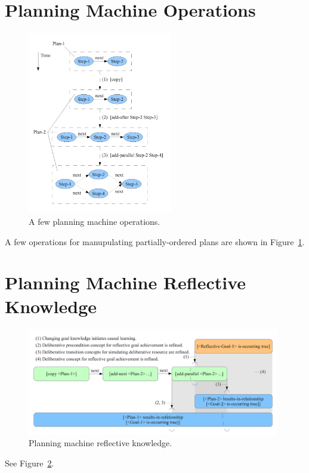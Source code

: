 \section{Planning Machine Operations}

\begin{figure}[bth]
  \center
  \includegraphics[height=8cm]{gfx/planning_machine_operations}
  \caption[A few planning machine operations.]{A few planning machine operations.}
  \label{fig:planning_machine_operations}
\end{figure}

A few operations for manupulating partially-ordered plans are shown in
Figure~\ref{fig:planning_machine_operations}.


\section{Planning Machine Reflective Knowledge}

\begin{figure}[bth]
  \center
  \includegraphics[width=11cm]{gfx/planning_machine_reflective_knowledge}
  \caption[Planning machine reflective knowledge.]{Planning machine reflective knowledge.}
  \label{fig:planning_machine_reflective_knowledge}
\end{figure}

See Figure~\ref{fig:planning_machine_reflective_knowledge}.

